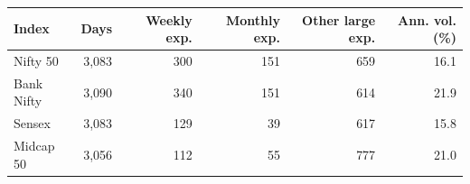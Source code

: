 \begin{tabular}{lrrrrr}
\toprule
Index & Days & Weekly exp. & Monthly exp. & Other large exp. & Ann. vol. (\%) \\
\midrule
Nifty 50 & 3,083 & 300 & 151 & 659 & 16.1 \\
Bank Nifty & 3,090 & 340 & 151 & 614 & 21.9 \\
Sensex & 3,083 & 129 & 39 & 617 & 15.8 \\
Midcap 50 & 3,056 & 112 & 55 & 777 & 21.0 \\
\bottomrule
\end{tabular}